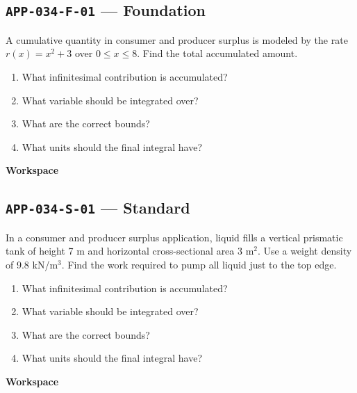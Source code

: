 \documentclass[11pt]{book}
\newcommand{\pid}[1]{\texttt{#1}}
\newcommand{\workspace}{\par\vspace{0.7in}\hrulefill\par\vspace{0.55in}\hrulefill\par}
\begin{document}
\subsection*{\pid{APP-034-F-01} — Foundation}
\begin{problembox}
A cumulative quantity in consumer and producer surplus is modeled by the rate $r(x)=x^2+3$ over $0\le x\le 8$. Find the total accumulated amount.
\end{problembox}
\begin{promptbox}\begin{enumerate}
\item What infinitesimal contribution is accumulated?
\item What variable should be integrated over?
\item What are the correct bounds?
\item What units should the final integral have?
\end{enumerate}\end{promptbox}
\textbf{Workspace}\workspace
{}
\subsection*{\pid{APP-034-S-01} — Standard}
\begin{problembox}
In a consumer and producer surplus application, liquid fills a vertical prismatic tank of height 7 m and horizontal cross-sectional area 3 m$^2$. Use a weight density of 9.8 kN/m$^3$. Find the work required to pump all liquid just to the top edge.
\end{problembox}
\begin{promptbox}\begin{enumerate}
\item What infinitesimal contribution is accumulated?
\item What variable should be integrated over?
\item What are the correct bounds?
\item What units should the final integral have?
\end{enumerate}\end{promptbox}
\textbf{Workspace}\workspace
{}
\end{document}
